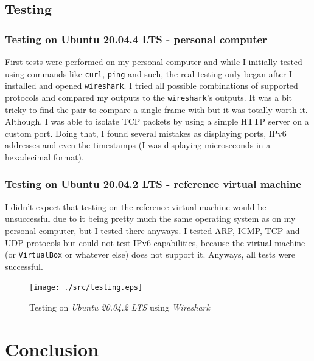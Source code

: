 \documentclass[a4paper]{article}
\begin{document}
  \subsection{Testing}

  \subsubsection{Testing on Ubuntu 20.04.4 LTS - personal computer}
  
  First tests were performed on my personal computer and while I initially
  tested using commands like \verb|curl|, \verb|ping| and such, the real
  testing only began after I installed and opened \verb|wireshark|. I
  tried all possible combinations of supported protocols and compared my 
  outputs to the \verb|wireshark|'s outputs. It was a bit tricky to find the 
  pair to compare a single frame with but it was totally worth it. Although, I 
  was able to isolate TCP packets by using a simple HTTP server on a custom 
  port. Doing that, I found several mistakes as displaying ports, IPv6 
  addresses and even the timestamps (I was displaying microseconds in a 
  hexadecimal format).


  \subsubsection{Testing on Ubuntu 20.04.2 LTS - reference virtual machine}

  I didn't expect that testing on the reference virtual machine would be 
  unsuccessful due to it being pretty much the same operating system as on my
  personal computer, but I tested there anyways. I tested ARP, ICMP, TCP and 
  UDP protocols but could not test IPv6 capabilities, because the virtual 
  machine (or \verb|VirtualBox| or whatever else) does not support it. Anyways,
  all tests were successful.

  \begin{figure}[h]
    \texttt{[image: ./src/testing.eps]}
    \caption{Testing on \textit{Ubuntu 20.04.2 LTS} using \textit{Wireshark}}
  \end{figure}

  \newpage


  \section{Conclusion}
\end{document}
